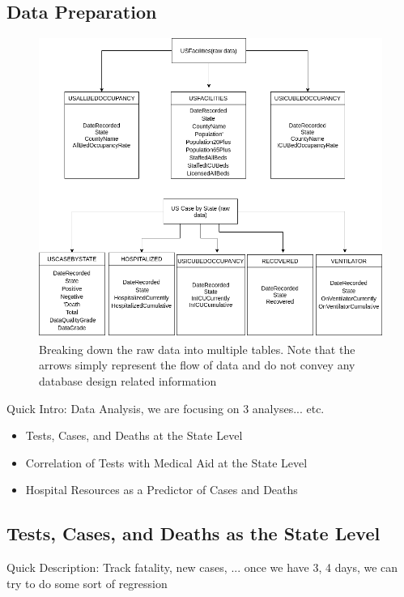 \documentclass[11pt]{article}
\begin{document}
\subsection{Data Preparation}
\begin{figure}[h!]
    \centering
    \includegraphics[width=\textwidth]{imgs/data_breakdown.png}
    \caption{Breaking down the raw data into multiple tables. Note that the arrows simply represent the flow of data and do not convey any database design related information}
    \label{fig:tbl_bd}
\end{figure}
\noindent
Quick Intro: Data Analysis, we are focusing on 3 analyses... etc. 

\begin{itemize}
    \item Tests, Cases, and Deaths at the State Level
    \item Correlation of Tests with Medical Aid at the State Level
    \item Hospital Resources as a Predictor of Cases and Deaths
\end{itemize}

\subsection{Tests, Cases, and Deaths as the State Level}

\noindent
Quick Description: Track fatality, new cases, ... once we have 3, 4 days, we can try to do some sort of regression
\end{document}
